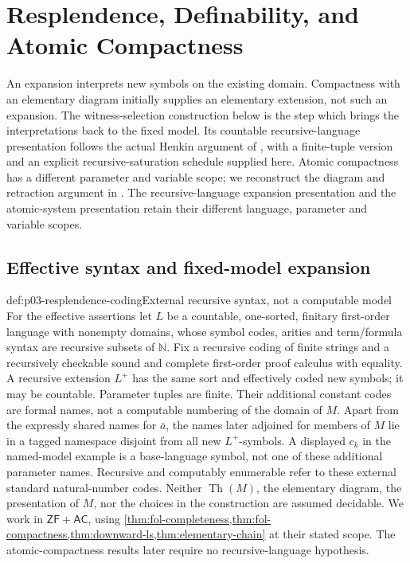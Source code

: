 \section{Resplendence, Definability, and Atomic Compactness}
\label{sec:p03-resplendence-atomic-compactness}

An expansion interprets new symbols on the existing domain. Compactness
with an elementary diagram initially supplies an elementary extension,
not such an expansion. The witness-selection construction below is the
step which brings the interpretations back to the fixed model. Its
countable recursive-language presentation follows the actual Henkin
argument of \cite[\S1.6, Definition~1.22 and Theorem~1.23, pp.~17--18]
{Engstrom2004Expansions}, with a finite-tuple version and an explicit
recursive-saturation schedule supplied here. Atomic compactness has a
different parameter and variable scope; we reconstruct the diagram and
retraction argument in \cite[\S2, pp.~100--102]{Delhomme1999AtomicGraphs}.
The recursive-language expansion presentation and the atomic-system
presentation retain their different language, parameter and variable scopes.

\subsection{Effective syntax and fixed-model expansion}

\begin{hbconvention}{def:p03-resplendence-coding}{External recursive syntax, not a computable model}
For the effective assertions let \(L\) be a countable, one-sorted,
finitary first-order language with nonempty domains, whose symbol codes,
arities and term/formula syntax are recursive subsets of \(\mathbb N\).
Fix a recursive coding of finite strings and a recursively checkable sound
and complete first-order proof calculus with equality. A recursive extension
\(L^+\) has the same sort and effectively coded new symbols; it may be
countable. Parameter tuples are finite. Their additional constant codes
are formal names, not a computable numbering of the domain of \(M\).
Apart from the expressly shared names for \(\bar a\), the names later
adjoined for members of \(M\) lie in a tagged namespace disjoint from
all new \(L^+\)-symbols. A displayed \(c_k\) in the named-model example
is a base-language symbol, not one of these additional parameter names.
Recursive and computably enumerable refer to these external standard
natural-number codes. Neither \(\operatorname{Th}(M)\), the elementary
diagram, the presentation of \(M\), nor the choices in the construction
are assumed decidable. We work in \(\mathsf{ZF}+\mathsf{AC}\), using
\cref{thm:fol-completeness,thm:fol-compactness,thm:downward-ls,thm:elementary-chain}
at their stated scope. The atomic-compactness results later require no
recursive-language hypothesis.
\end{hbconvention}

